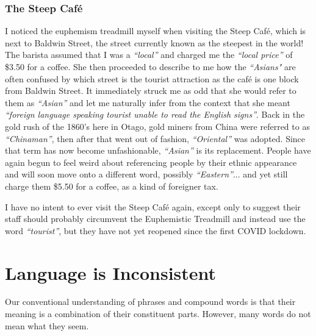 \subsubsection{The Steep Caf{\'e}}
I noticed the euphemism treadmill myself when visiting the Steep Caf{\'e}, which is next to Baldwin Street, the street currently known as the steepest in the world! The barista assumed that I was a \textit{``local''} and charged me the \textit{``local price''} of \$3.50 for a coffee. She then proceeded to describe to me how the \textit{``Asians"} are often confused by which street is the tourist attraction as the caf{\'e} is one block from Baldwin Street. It immediately struck me as odd that she would refer to them as \textit{``Asian''} and let me naturally infer from the context that she meant \textit{``foreign language speaking tourist unable to read the English signs''}. Back in the gold rush of the 1860's here in Otago, gold miners from China were referred to as \textit{``Chinaman''}, then after that went out of fashion, \textit{``Oriental''} was adopted. Since that term has now become unfashionable, \textit{``Asian''} is its replacement. People have again begun to feel weird about referencing people by their ethnic appearance and will soon move onto a different word, possibly \textit{``Eastern''}... and yet still charge them \$5.50 for a coffee, as a kind of foreigner tax.

I have no intent to ever visit the Steep Caf{\'e} again, except only to suggest their staff should probably circumvent the Euphemistic Treadmill and instead use the word \textit{``tourist''}, but they have not yet reopened since the first COVID lockdown.





\section{Language is Inconsistent}
Our conventional understanding of phrases and compound words is that their meaning is a combination of their constituent parts. However, many words do not mean what they seem.

